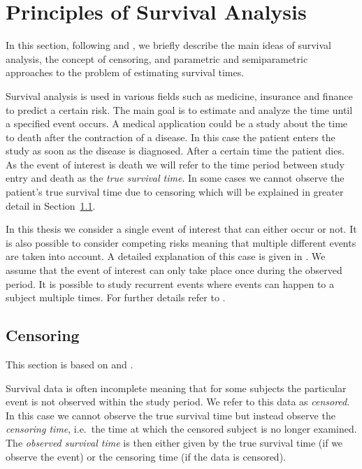 \documentclass[12pt, a4paper]{scrartcl}
\theoremstyle{definition}
\theoremstyle{plain}
\numberwithin{equation}{section}
\numberwithin{figure}{section}
\numberwithin{table}{section}
\begin{document}
	\section{Principles of Survival Analysis}\label{sec:sa}
		
	In this section, following \citet*{sabook} and \citet*{mathsabook}, we briefly describe the main ideas of survival analysis, the concept of censoring, and parametric and semiparametric approaches to the problem of estimating survival times.
	
	Survival analysis is used in various fields such as medicine, insurance and finance to predict a certain risk.
	The main goal is to estimate and analyze the time until a specified event occurs.
	A medical application could be a study about the time to death after the contraction of a disease.
	In this case the patient enters the study as soon as the disease is diagnosed.
	After a certain time the patient dies.
	As the event of interest is death we will refer to the time period between study entry and death as the \emph{true survival time}.
	In some cases we cannot observe the patient's true survival time due to censoring which will be explained in greater detail in Section~\ref{censoring}.
	
	In this thesis we consider a single event of interest that can either occur or not.
	It is also possible to consider competing risks meaning that multiple different events are taken into account.
	A detailed explanation of this case is given in \citet*[Chapter~8]{bookfailuretime}.
	We assume that the event of interest can only take place once during the observed period.
	It is possible to study recurrent events where events can happen to a subject multiple times.
	For further details refer to \citet*[Chapter~9]{bookfailuretime}.
	
	\subsection{Censoring} \label{censoring}
	\enlargethispage{3em}
	This section is based on \citet*{sabook} and \citet*{mathsabook}.
	
	Survival data is often incomplete meaning that for some subjects the particular event is not observed within the study period.
	We refer to this data as \emph{censored}.
	In this case we cannot observe the true survival time but instead observe the \emph{censoring time}, {i.e.}~the time at which the censored subject is no longer examined.
	The \emph{observed survival time} is then either given by the true survival time (if we observe the event) or the censoring time (if the data is censored).
	
\end{document}
